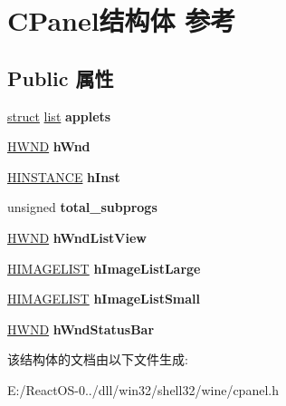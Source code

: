 \hypertarget{struct_c_panel}{}\section{C\+Panel结构体 参考}
\label{struct_c_panel}
\subsection*{Public 属性}
\begin{DoxyCompactItemize}
\item 
\mbox{\label{struct_c_panel_a514ce0781bf526abf3392881c52156a9}} 
\hyperlink{interfacestruct}{struct} \hyperlink{classlist}{list} {\bfseries applets}
\item 
\mbox{\label{struct_c_panel_ab13b68053bbd470fd25dea727dc31da8}} 
\hyperlink{interfacevoid}{H\+W\+ND} {\bfseries h\+Wnd}
\item 
\mbox{\label{struct_c_panel_a6edcf123556629dc974b2907542ea9a9}} 
\hyperlink{interfacevoid}{H\+I\+N\+S\+T\+A\+N\+CE} {\bfseries h\+Inst}
\item 
\mbox{\label{struct_c_panel_a5e8acbf92e46e74410d181610ad2e670}} 
unsigned {\bfseries total\+\_\+subprogs}
\item 
\mbox{\label{struct_c_panel_aa37a6ec038df76fa28b6d54b7c75b49a}} 
\hyperlink{interfacevoid}{H\+W\+ND} {\bfseries h\+Wnd\+List\+View}
\item 
\mbox{\label{struct_c_panel_a1a256e4b4e46fc26ac9645179e112c7b}} 
\hyperlink{struct___i_m_a_g_e_l_i_s_t}{H\+I\+M\+A\+G\+E\+L\+I\+ST} {\bfseries h\+Image\+List\+Large}
\item 
\mbox{\label{struct_c_panel_a554c5041b0a5d0a58a236bd604c74eca}} 
\hyperlink{struct___i_m_a_g_e_l_i_s_t}{H\+I\+M\+A\+G\+E\+L\+I\+ST} {\bfseries h\+Image\+List\+Small}
\item 
\mbox{\label{struct_c_panel_a7e9a2674e5f486d4757d5b4ee2fcaaa8}} 
\hyperlink{interfacevoid}{H\+W\+ND} {\bfseries h\+Wnd\+Status\+Bar}
\end{DoxyCompactItemize}


该结构体的文档由以下文件生成\+:\begin{DoxyCompactItemize}
\item 
E\+:/\+React\+O\+S-\/0../dll/win32/shell32/wine/cpanel.\+h\end{DoxyCompactItemize}
